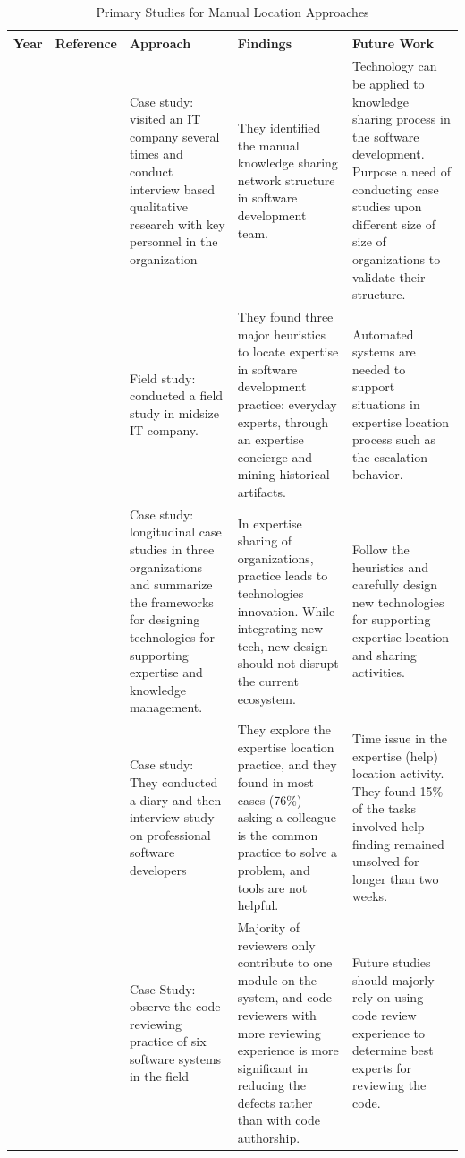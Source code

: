 \begin{table}[htbp]
\centering
\small
\settowidth{}
\begin{tabulary}{\textwidth}{LLLLL}
\hline
\textbf{Year}           & \textbf{Reference}          & \textbf{Approach}           & \textbf{Findings}  & \textbf{Future Work}\\ \hline
\citeyear{waterson1997dynamics} & \citeauthor{waterson1997dynamics}\cite{waterson1997dynamics} & Case study: visited an IT company several times and conduct interview based qualitative research with key personnel in the organization & They identified the manual knowledge sharing network structure in software development team. & Technology can be applied to knowledge sharing process in the software development. Purpose a need of conducting case studies upon different size of size of organizations to validate their structure. \\ \hline
\citeyear{mcdonald1998just} & \citeauthor{mcdonald1998just}\cite{mcdonald1998just} & Field study: conducted a field study in midsize IT company. & They found three major heuristics to locate expertise in software development practice: everyday experts, through an expertise concierge and mining historical artifacts. & Automated systems are needed to support situations in expertise location process such as the escalation behavior. \\\hline
\citeyear{pipek2012bridging} & \citeauthor{pipek2012bridging}\cite{pipek2012bridging} & Case study: longitudinal case studies in three organizations and summarize the frameworks for designing technologies for supporting expertise and knowledge management. & In expertise sharing of organizations, practice leads to technologies innovation. While integrating new tech, new design should not disrupt the current ecosystem. & Follow the heuristics and carefully design new technologies for supporting expertise location and sharing activities. \\\hline
\citeyear{yarosh2013need} & \citeauthor{yarosh2013need}\cite{yarosh2013need} & Case study: They conducted a diary and then interview study on professional software developers & They explore the expertise location practice, and they found in most cases (76\%) asking a colleague is the common practice to solve a problem, and tools are not helpful. & Time issue in the expertise (help) location activity. They found 15\% of the tasks involved help-finding remained unsolved for longer than two weeks. \\\hline
\citeyear{thongtanunam2016revisiting} & \citeauthor{thongtanunam2016revisiting}\cite{thongtanunam2016revisiting} & Case Study: observe the code reviewing practice of six software systems in the field & Majority of reviewers only contribute to one module on the system, and code reviewers with more reviewing experience is more significant in reducing the defects rather than with code authorship. & Future studies should majorly rely on using code review experience to determine best experts for reviewing the code.\\ \hline
\end{tabulary}
\caption{Primary Studies for Manual Location Approaches}
\label{tab:manual}
\end{table}
